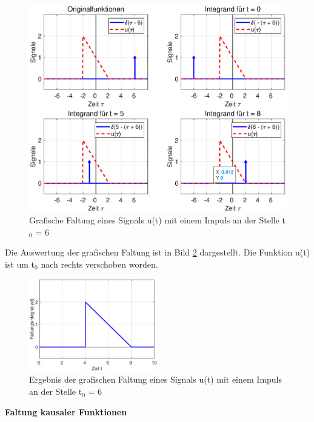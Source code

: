 \begin{figure}[H]
  \centerline{\includegraphics[width=1\textwidth]{Kapitel2/Bilder/image20}}
  \caption{Grafische Faltung eines Signals u(t) mit einem Impuls an der Stelle t$_{0}$ = 6}
  \label{fig:FaltungGrafischImpuls}
\end{figure}

\noindent Die Auswertung der grafischen Faltung ist in Bild \ref{fig:FaltungGrafischImpulsBSP} dargestellt. Die Funktion u(t) ist um t$_{0}$ nach rechts verschoben worden.

\begin{figure}[H]
  \centerline{\includegraphics[width=0.5\textwidth]{Kapitel2/Bilder/image21}}
  \caption{Ergebnis der grafischen Faltung eines Signals u(t) mit einem Impuls an der Stelle t$_{0}$ = 6}
  \label{fig:FaltungGrafischImpulsBSP}
\end{figure}

\clearpage

{\selectfont
\noindent\textbf{Faltung kausaler Funktionen}}\smallskip


